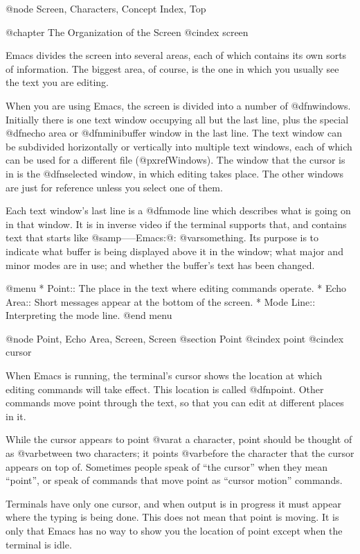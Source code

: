 @node Screen, Characters, Concept Index, Top

@chapter The Organization of the Screen
@cindex screen

  Emacs divides the screen into several areas, each of which contains
its own sorts of information.  The biggest area, of course, is the one
in which you usually see the text you are editing.

  When you are using Emacs, the screen is divided into a number of
@dfn{windows}.  Initially there is one text window occupying all but the
last line, plus the special @dfn{echo area} or @dfn{minibuffer window} in
the last line.  The text window can be subdivided horizontally or
vertically into multiple text windows, each of which can be used for a
different file (@pxref{Windows}).  The window that the cursor is in is the
@dfn{selected window}, in which editing takes place.  The other windows are
just for reference unless you select one of them.

  Each text window's last line is a @dfn{mode line} which describes what is
going on in that window.  It is in inverse video if the terminal supports
that, and contains text that starts like @samp{-----Emacs:@: @var{something}}.  Its
purpose is to indicate what buffer is being displayed above it in the
window; what major and minor modes are in use; and whether the buffer's
text has been changed.

@menu
* Point::	The place in the text where editing commands operate.
* Echo Area::   Short messages appear at the bottom of the screen.
* Mode Line::	Interpreting the mode line.
@end menu

@node Point, Echo Area, Screen, Screen
@section Point
@cindex point
@cindex cursor

  When Emacs is running, the terminal's cursor shows the location at
which editing commands will take effect.  This location is called
@dfn{point}.  Other commands move point through the text, so that you
can edit at different places in it.

  While the cursor appears to point @var{at} a character, point should be
thought of as @var{between} two characters; it points @var{before} the character
that the cursor appears on top of.  Sometimes people speak of ``the
cursor'' when they mean ``point'', or speak of commands that move point as
``cursor motion'' commands.

  Terminals have only one cursor, and when output is in progress it must
appear where the typing is being done.  This does not mean that point is
moving.  It is only that Emacs has no way to show you the location of point
except when the terminal is idle.

